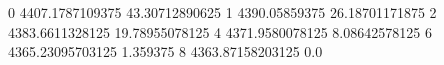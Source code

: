 0 4407.1787109375 43.30712890625
1 4390.05859375 26.18701171875
2 4383.6611328125 19.78955078125
4 4371.9580078125 8.08642578125
6 4365.23095703125 1.359375
8 4363.87158203125 0.0
